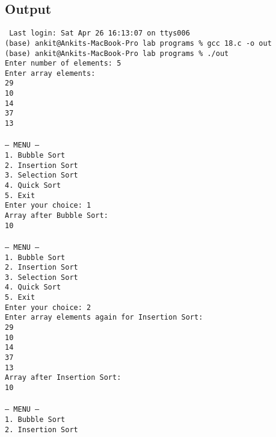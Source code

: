 \documentclass[12pt,a4paper]{article}
\begin{document}
\subsection*{Output}
\begin{tcolorbox}[terminalstyle, title=Sample Output]
\texttt{
Last login: Sat Apr 26 16:13:07 on ttys006\\
(base) ankit@Ankits-MacBook-Pro lab programs \% gcc 18.c -o out\\
(base) ankit@Ankits-MacBook-Pro lab programs \% ./out\\
Enter number of elements: 5\\
Enter array elements:\\
29\\
10\\
14\\
37\\
13\\
\\
--- MENU ---\\
1. Bubble Sort\\
2. Insertion Sort\\
3. Selection Sort\\
4. Quick Sort\\
5. Exit\\
Enter your choice: 1\\
Array after Bubble Sort:\\
10    \\
\\
--- MENU ---\\
1. Bubble Sort\\
2. Insertion Sort\\
3. Selection Sort\\
4. Quick Sort\\
5. Exit\\
Enter your choice: 2\\
Enter array elements again for Insertion Sort:\\
29\\
10\\
14\\
37\\
13\\
Array after Insertion Sort:\\
10    \\
\\
--- MENU ---\\
1. Bubble Sort\\
2. Insertion Sort\\
}
\end{tcolorbox}
\end{document}
